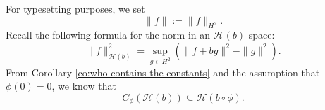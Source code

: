 \documentclass[11pt]{amsart}
\def\HH{{\mathcal H}}
\def\YY{{\mathcal Y}}
\renewcommand{\subset}{\subseteq}
\numberwithin{equation}{section}
\theoremstyle{plain}
\newtheorem{lemma}[equation]{Lemma}
\theoremstyle{definition}
\begin{document}
For typesetting purposes, we set 
$$\|f\| := \|f\|_{H^2}.$$
%
%	
%		
%		
Recall the following formula \cite[Sec.~16.9]{Hb2-book} for the norm in an $\HH(b)$ space:
\begin{equation}\label{eq:norm in H(b)}
\| f \|_{\HH(b)}^2=\sup_{g\in H^2}(\|  f+bg \|^2-\|  g \|^2).
\end{equation}
From Corollary \ref{co:who contains the constants} and the assumption that $\phi(0) = 0$,  we know  that 
$$ C_\phi (\mathcal{H}(b))\subset  \mathcal{H}(b \circ \phi).$$
\end{document}
